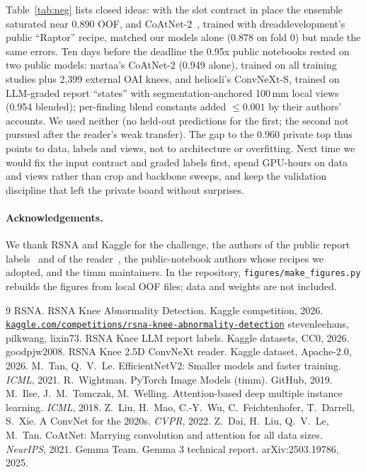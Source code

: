 \documentclass[10pt,twocolumn]{article}
\begin{document}
Table~\ref{tab:neg} lists closed ideas: with the slot contract in place the ensemble saturated near 0.890 OOF, and
CoAtNet-2~\cite{coatnet}, trained with dreaddevelopment's public ``Raptor'' recipe, matched our models alone (0.878 on
fold 0) but made the same errors. Ten days before the deadline the 0.95x
public notebooks rested on two public models: nartaa's CoAtNet-2 (0.949 alone), trained on all training studies plus
2,399 external OAI knees, and heliosli's ConvNeXt-S, trained on LLM-graded report ``states'' with
segmentation-anchored 100\,mm local views (0.954 blended); per-finding blend constants added $\leq0.001$ by their authors' accounts. We used
neither (no held-out predictions for the first; the second not pursued after the reader's weak transfer). The gap to
the 0.960 private top thus points to data, labels and views, not to architecture or overfitting. Next time we would fix
the input contract and graded labels first, spend GPU-hours on data and views rather than crop and backbone sweeps, and
keep the validation discipline that left the private board without surprises.

\paragraph{Acknowledgements.} We thank RSNA and Kaggle for the challenge, the authors of the public report labels~\cite{labels}
and of the reader~\cite{reader}, the public-notebook authors whose recipes we adopted, and the timm maintainers. In the repository,
\texttt{figures/make\_figures.py} rebuilds the figures from local OOF files; data and weights are not included.

\begin{thebibliography}{9}\scriptsize
\setlength{\itemsep}{0pt}\setlength{\parsep}{0pt}\setlength{\topsep}{1pt}
 RSNA. RSNA Knee Abnormality Detection. Kaggle competition, 2026.
\href{https://www.kaggle.com/competitions/rsna-knee-abnormality-detection}{\nolinkurl{kaggle.com/competitions/rsna-knee-abnormality-detection}}
 stevenleehans, pilkwang, lixin73. RSNA Knee LLM report labels. Kaggle datasets, CC0, 2026.
 goodpjw2008. RSNA Knee 2.5D ConvNeXt reader. Kaggle dataset, Apache-2.0, 2026.
 M.~Tan, Q.~V.~Le. EfficientNetV2: Smaller models and faster training. \emph{ICML}, 2021.
 R.~Wightman. PyTorch Image Models (timm). GitHub, 2019.
 M.~Ilse, J.~M.~Tomczak, M.~Welling. Attention-based deep multiple instance learning. \emph{ICML}, 2018.
 Z.~Liu, H.~Mao, C.-Y.~Wu, C.~Feichtenhofer, T.~Darrell, S.~Xie. A ConvNet for the 2020s.
\emph{CVPR}, 2022.
 Z.~Dai, H.~Liu, Q.~V.~Le, M.~Tan. CoAtNet: Marrying convolution and attention for all data sizes.
\emph{NeurIPS}, 2021.
 Gemma Team. Gemma 3 technical report. arXiv:2503.19786, 2025.
\end{thebibliography}
\end{document}
